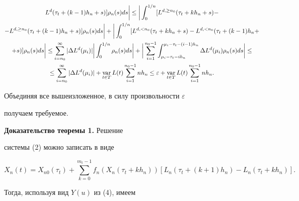 \begin{pf}
\begin{gather*}
L^d(\tau_t+(k-1)h_n+s)]\rho_n(s)ds\bigg|\leq


\bigg|\int_0^{1/n} [L^{d, \geq n_0}(\tau_t+kh_n+s)-\\


-L^{d,\geq n_0}(\tau_t+(k-1)h_n+s)]\rho_n(s)ds\bigg|+\bigg|\int_0^{1/n}


[L^{d,<n_0}(\tau_t+kh_n+s)- L^{d,<n_0}


(\tau_t+(k-1)h_n+\\


+s)]\rho_n(s)ds\bigg|\leq


\sum_{i=n_0}^{\infty}|\Delta L^d(\mu_i)|\bigg|


\int_0^{1/n}\rho_n(s)ds\bigg|+\bigg|\sum_{i=1}^{n_0-1}


\int_{\mu_i-\tau_t-ih_n}^{\mu_i-\tau_t-(i-1)h_n} \Delta


L^d(\mu_i)\rho_n(s)ds\bigg|\leq\\


\le\sum_{i=n_0}^{\infty}|\Delta L^d(\mu_i)|+\var_{t\in T}


L(t)\sum_{i=1}^{n_0-1}nh_n\leq\varepsilon+\var_{t\in T}


L(t) \sum_{i=1}^{n_0-1}nh_n.


\end{gather*}





Объединяя все вышеизложенное, в силу произвольности $\varepsilon$


получаем требуемое.


\end{pf}





{\bf Доказательство теоремы 1.} Решение


системы (2) можно записать в виде


$$


X_n(t)=X_{n0}(\tau_t)+\sum_{k=0}^{m_t-1}f_n


(X_n(\tau_t+kh_n))[L_n(\tau_t +(k+1)h_n) - L_n(\tau_t +kh_n)].


$$


Тогда, используя вид $Y(u)$ из (4), имеем


